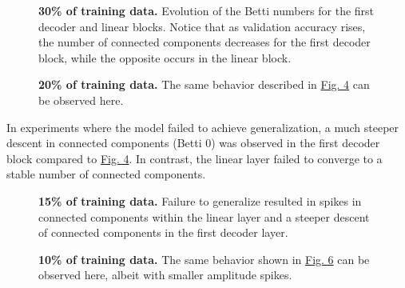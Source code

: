 \begin{figure}
    \centering
    
    
    \caption[30\% of training data.]{\textbf{30\% of training data.} Evolution of the Betti numbers for the first decoder and linear blocks. Notice that as validation accuracy rises, the number of connected components decreases for the first decoder block, while the opposite occurs in the linear block.}
    \label{fig:sum-decoder0-linear-30pct}
\end{figure}

\begin{figure}
    \centering
    
    
    \caption[20\% of training data.]{\textbf{20\% of training data.} The same behavior described in \hyperref[fig:sum-decoder0-linear-30pct]{Fig. 4} can be observed here.}
    \label{fig:sum-decoder0-linear-20pct}
\end{figure}

In experiments where the model failed to achieve generalization, a much steeper descent in connected components (Betti 0) was observed in the first decoder block compared to \hyperref[fig:sum-decoder0-linear-30pct]{Fig. 4}. In contrast, the linear layer failed to converge to a stable number of connected components.

\begin{figure}
    \centering
    
    
    \caption[15\% of training data.]{\textbf{15\% of training data.} Failure to generalize resulted in spikes in connected components within the linear layer and a steeper descent of connected components in the first decoder layer.}
    \label{fig:sum-decoder0-linear-15pct}
\end{figure}

\begin{figure}
    \centering
    
    
    \caption[10\% of training data.]{\textbf{10\% of training data.} The same behavior shown in \hyperref[fig:sum-decoder0-linear-15pct]{Fig. 6} can be observed here, albeit with smaller amplitude spikes.}
    \label{fig:sum-decoder0-linear-10pct}
\end{figure}

